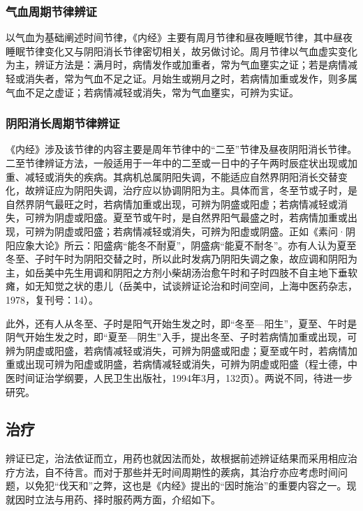 \documentclass[draft,12pt]{ctexbook}
\begin{document}
\subsubsection{气血周期节律辨证}%

以气血为基础阐述时间节律，《内经》主要有周月节律和昼夜睡眠节律，其中昼夜睡眠节律变化又与阴阳消长节律密切相关，故另做讨论。周月节律以气血虚实变化为主，辨证方法是：满月时，病情发作或加重者，常为气血壅实之证；若是病情减轻或消失者，常为气血不足之证。月始生或朔月之时，若病情加重或发作，则多属气血不足之虚证；若病情减轻或消失，常为气血壅实，可辨为实证。

\subsubsection{阴阳消长周期节律辨证}%

《内经》涉及该节律的内容主要是周年节律中的“二至”节律及昼夜阴阳消长节律。二至节律辨证方法，一般适用于一年中的二至或一日中的子午两时辰症状出现或加重、减轻或消失的疾病。其病机总属阴阳失调，不能适应自然界阴阳消长交替变化，故辨证应为阴阳失调，治疗应以协调阴阳为主。具体而言，冬至节或子时，是自然界阴气最旺之时，若病情加重或出现，可辨为阴盛或阳虚；若病情减轻或消失，可辨为阴虚或阳盛。夏至节或午时，是自然界阳气最盛之时，若病情加重或出现，可辨为阴虚或阳盛；若病情减轻或消失，可辨为阳虚或阴盛。正如《素问·阴阳应象大论》所云：阳盛病“能冬不耐夏”，阴盛病“能夏不耐冬”。亦有人认为夏至冬至、子时午时为阴阳交替之时，所以此时发病乃阴阳失调之象，故应调和阴阳为主，如岳美中先生用调和阴阳之方剂小柴胡汤治愈午时和子时四肢不自主地下垂软瘫，如无知觉之状的患儿（岳美中，试谈辨证论治和时间空间，上海中医药杂志，1978，复刊号：14）。

此外，还有人从冬至、子时是阳气开始生发之时，即“冬至—阳生”，夏至、午时是阴气开始生发之时，即“夏至—阴生”入手，提出冬至、子时若病情加重或出现，可辨为阴虚或阳盛，若病情减轻或消失，可辨为阴盛或阳虚；夏至或午时，若病情加重或出现可辨为阳虚或阴盛，若病情减轻或消失，可辨为阴虚或阳盛（程士德，中医时间证治学纲要，人民卫生出版社，1994年3月，132页）。两说不同，待进一步研究。

\subsection{治疗}%

辨证已定，治法依证而立，用药也就因法而处，故根据前述辨证结果而采用相应治疗方法，自不待言。而对于那些并无时间周期性的蒺病，其治疗亦应考虑时间问题，以免犯“伐天和”之弊，这也是《内经》提出的“因时施治”的重要内容之一。现就因时立法与用药、择时服药两方面，介绍如下。
\end{document}
